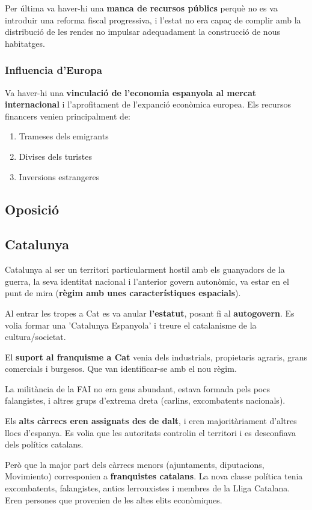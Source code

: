 \documentclass[arial,a4paper,print]{article}
\begin{document}
Per última va haver-hi una \textbf{manca de recursos públics} perquè no es va introduir una reforma fiscal progressiva, i l'estat no era capaç de complir amb la distribució de les rendes no impulsar adequadament la construcció de nous habitatges. 

\subsubsection{Influencia d'Europa}
Va haver-hi una \textbf{vinculació de l'economia espanyola al mercat internacional} i l'aprofitament de l'expanció econòmica europea. Els recursos financers venien principalment de: 
\begin{enumerate}
	\item Trameses dels emigrants
	\item Divises dels turistes
	\item Inversions estrangeres
\end{enumerate} 

\subsection{Oposició}


\subsection{Catalunya}
Catalunya al ser un territori particularment hostil amb els guanyadors de la guerra, la seva identitat nacional i l'anterior govern autonòmic, va estar en el punt de mira (\textbf{règim amb unes característiques espacials}). 

Al entrar les tropes a Cat es va anular \textbf{l'estatut}, posant fi al \textbf{autogovern}. Es volia formar una 'Catalunya Espanyola' i treure el catalanisme de la cultura/societat. 

El \textbf{suport al franquisme a Cat} venia dels industrials, propietaris agraris, grans comercials i burgesos. Que van identificar-se amb el nou règim. 

La militància de la FAI no era gens abundant, estava formada pels pocs falangistes, i altres grups d'extrema dreta (carlins, excombatents nacionals). 

Els \textbf{alts càrrecs eren assignats des de dalt}, i eren majoritàriament d'altres llocs d'espanya. Es volia que les autoritats controlin el territori i es desconfiava dels polítics catalans. 

Però que la major part dels càrrecs menors (ajuntaments, diputacions, Movimiento) corresponien a \textbf{franquistes catalans}. La nova classe política tenia excombatents, falangistes, antics lerrouxistes i membres de la Lliga Catalana. Eren persones que provenien de les altes elits econòmiques. 
\end{document}
